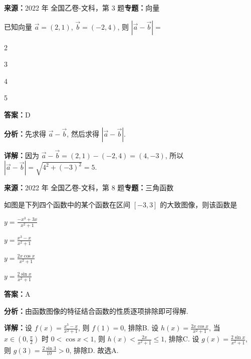 \begin{question}[points=5]
\textbf{来源：}2022 年 全国乙卷-文科，第 3 题\quad \textbf{专题：}向量\par
已知向量 $\vec{a}=(2,1)$, $\vec{b}=(-2,4)$, 则 $|\vec{a} - \vec{b}| =$
\begin{choices}
  \item 2
  \item 3
  \item 4
  \item 5
\end{choices}
\begin{solution}
\textbf{答案：}D

\textbf{分析：}先求得 $\vec{a} - \vec{b}$, 然后求得 $|\vec{a} - \vec{b}|$.

\textbf{详解：}因为 $\vec{a} - \vec{b} = (2,1) - (-2,4) = (4,-3)$, 所以 $|\vec{a} - \vec{b}| = \sqrt{4^2 + (-3)^2} = 5$.
\end{solution}
\end{question}

\begin{question}[points=5]
\textbf{来源：}2022 年 全国乙卷-文科，第 8 题\quad \textbf{专题：}三角函数\par
如图是下列四个函数中的某个函数在区间 $[-3,3]$ 的大致图像，则该函数是
\begin{choices}
  \item $y=\frac{-x^3+3x}{x^2+1}$
  \item $y=\frac{x^3-x}{x^2+1}$
  \item $y=\frac{2x\cos x}{x^2+1}$
  \item $y=\frac{2\sin x}{x^2+1}$
\end{choices}
\begin{solution}
\textbf{答案：}A

\textbf{分析：}由函数图像的特征结合函数的性质逐项排除即可得解.

\textbf{详解：}设 $f(x)=\frac{x^3-x}{x^2+1}$, 则 $f(1)=0$, 排除B. 设 $h(x)=\frac{2x\cos x}{x^2+1}$, 当 $x\in(0,\frac{\pi}{2})$ 时 $0<\cos x<1$, 则 $h(x)<\frac{2x}{x^2+1}\le 1$, 排除C. 设 $g(x)=\frac{2\sin x}{x^2+1}$, 则 $g(3)=\frac{2\sin3}{10}>0$, 排除D. 故选A.
\end{solution}
\end{question}

